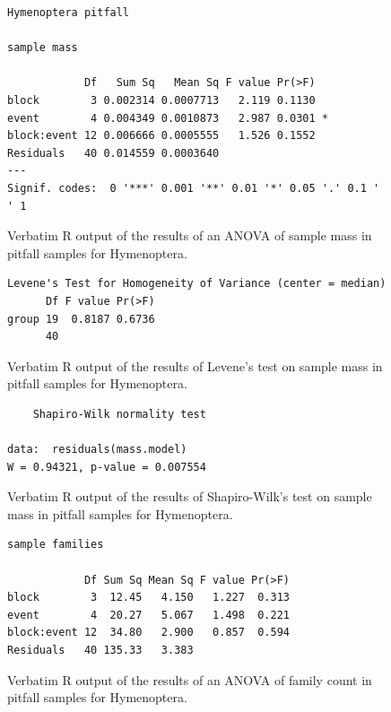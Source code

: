 \documentclass[10pt,letterpaper,twocolumn]{article}
\begin{document}
\begin{figure}[h]
	\lstset{numbers=left}
	\lstset{xleftmargin=5mm,framexleftmargin=5mm}
	\begin{lstlisting}
Hymenoptera pitfall 

sample mass 

            Df   Sum Sq   Mean Sq F value Pr(>F)  
block        3 0.002314 0.0007713   2.119 0.1130  
event        4 0.004349 0.0010873   2.987 0.0301 *
block:event 12 0.006666 0.0005555   1.526 0.1552  
Residuals   40 0.014559 0.0003640                 
---
Signif. codes:  0 '***' 0.001 '**' 0.01 '*' 0.05 '.' 0.1 ' ' 1
	\end{lstlisting}
	\caption{Verbatim R output of the results of an ANOVA of sample mass in pitfall samples for Hymenoptera.}
	\label{fig:pitfall_hymenoptera_mass_anova}
	\smallskip
	\nointerlineskip
	\hrulefill
\end{figure}

\begin{figure}[h]
	\lstset{numbers=left}
	\lstset{xleftmargin=5mm,framexleftmargin=5mm}
	\begin{lstlisting}
Levene's Test for Homogeneity of Variance (center = median)
      Df F value Pr(>F)
group 19  0.8187 0.6736
      40               
	\end{lstlisting}
	\caption{Verbatim R output of the results of Levene's test on sample mass in pitfall samples for Hymenoptera.}
	\label{fig:pitfall_hymenoptera_mass_levene}
	\smallskip
	\nointerlineskip
	\hrulefill
\end{figure}

\begin{figure}[h]
	\lstset{numbers=left}
	\lstset{xleftmargin=5mm,framexleftmargin=5mm}
	\begin{lstlisting}
	Shapiro-Wilk normality test

data:  residuals(mass.model)
W = 0.94321, p-value = 0.007554
	\end{lstlisting}
	\caption{Verbatim R output of the results of Shapiro-Wilk's test on sample mass in pitfall samples for Hymenoptera.}
	\label{fig:pitfall_hymenoptera_mass_shapiro}
	\smallskip
	\nointerlineskip
	\hrulefill
\end{figure}

\begin{figure}[h]
	\lstset{numbers=left}
	\lstset{xleftmargin=5mm,framexleftmargin=5mm}
	\begin{lstlisting}
sample families 

            Df Sum Sq Mean Sq F value Pr(>F)
block        3  12.45   4.150   1.227  0.313
event        4  20.27   5.067   1.498  0.221
block:event 12  34.80   2.900   0.857  0.594
Residuals   40 135.33   3.383               
	\end{lstlisting}
	\caption{Verbatim R output of the results of an ANOVA of family count in pitfall samples for Hymenoptera.}
	\label{fig:pitfall_hymenoptera_family_anova}
	\smallskip
	\nointerlineskip
	\hrulefill
\end{figure}
\end{document}
